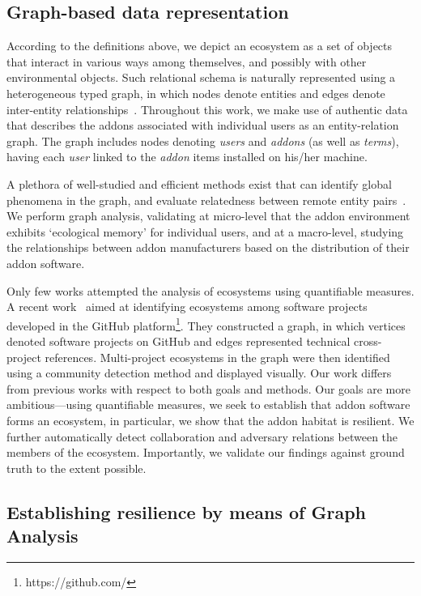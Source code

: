 \documentclass[ijoc,nonblindrev]{informs3} %
\numberwithin{equation}{subsection}
\begin{document}
\subsection{Graph-based data representation}
\label{sec:pagerank_related}

According to the definitions above, we depict an ecosystem as a set of objects that interact in various ways among themselves, and possibly with other environmental objects. Such relational schema is naturally represented using a heterogeneous typed graph, in which nodes denote entities and edges denote  inter-entity relationships~\citep{minkov2010improving,sunWSDM12}. Throughout this work, we make use of authentic data that describes the addons associated with individual users as an entity-relation graph. The graph includes nodes denoting {\it users} and {\it addons} (as well as {\it terms}), having each {\it user} linked to the {\it addon} items installed on his/her machine.

A plethora of well-studied and efficient methods exist that can identify global phenomena in the graph, and evaluate relatedness between remote entity pairs~\citep{kleinberg07,sun12}. We perform graph analysis, validating at micro-level that the addon environment exhibits `ecological memory' for individual users, and at a macro-level, studying the relationships between addon manufacturers based on the distribution of their addon software.  

Only few works attempted the analysis of ecosystems using quantifiable measures. A recent work~\citep{blincoeMSR15} aimed at identifying ecosystems among software projects developed in the GitHub platform\footnote{https://github.com/}. They constructed a graph, in which vertices denoted software projects on GitHub and edges represented technical cross-project references. Multi-project ecosystems in the graph were then identified using a community detection method and displayed visually. Our work differs from previous works with respect to both goals and methods. Our goals are more ambitious---using quantifiable measures, we seek to establish that addon software forms an ecosystem, in particular, we show that the addon habitat is resilient. We further automatically detect collaboration and adversary relations between the members of the ecosystem. Importantly, we validate our findings against ground truth to the extent possible.

\subsection{Establishing resilience by means of Graph Analysis}
\label{sec:link_prediction}
\end{document}
